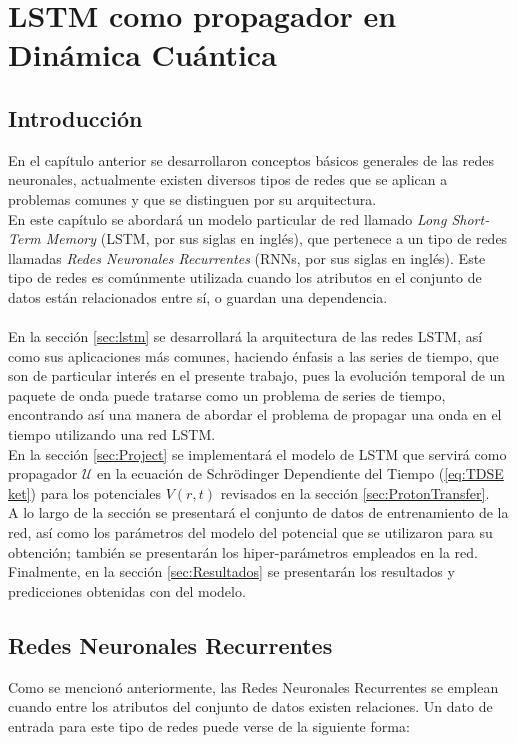 \chapter{LSTM como propagador en Dinámica Cuántica}\label{ch:LSTMapplied}
\section{Introducción}
En el capítulo anterior se desarrollaron conceptos básicos generales de las redes neuronales, actualmente existen diversos tipos de redes que se aplican a problemas comunes y que se distinguen por su arquitectura.
\\
En este capítulo se abordará un modelo particular de red llamado \emph{Long Short-Term Memory} (\acs{LSTM}, por sus siglas en inglés), que pertenece a un tipo de redes llamadas \emph{Redes Neuronales Recurrentes} (\acp{RNN}, por sus siglas en inglés). Este tipo de redes es comúnmente utilizada cuando los atributos en el conjunto de datos están relacionados entre sí, o guardan una dependencia.
\\\\
En la sección \autoref{sec:lstm} se desarrollará la arquitectura de las redes \acs{LSTM}, así como sus aplicaciones más comunes, haciendo énfasis a las series de tiempo, que son de particular interés en el presente trabajo, pues la evolución temporal de un paquete de onda puede tratarse como un problema de series de tiempo, encontrando así una manera de abordar el problema de propagar una onda en el tiempo utilizando una red \acs{LSTM}.
\\
En la sección \autoref{sec:Project} se implementará el modelo de \acs{LSTM} que servirá como propagador $\mathcal{U}$ en la ecuación de Schrödinger Dependiente del Tiempo (\autoref{eq:TDSE ket}) para los potenciales $V(r,t)$ revisados en la sección \autoref{sec:ProtonTransfer}.
\\
A lo largo de la sección se presentará el conjunto de datos de entrenamiento de la red, así como los parámetros del modelo del potencial que se utilizaron para su obtención; también se presentarán los hiper-parámetros empleados en la red. Finalmente, en la sección \autoref{sec:Resultados} se presentarán los resultados y predicciones obtenidas con del modelo.

\section{Redes Neuronales Recurrentes}\label{sec:RNN}
Como se mencionó anteriormente, las Redes Neuronales Recurrentes se emplean cuando entre los atributos del conjunto de datos existen relaciones. Un dato de entrada para este tipo de redes puede verse de la siguiente forma:

